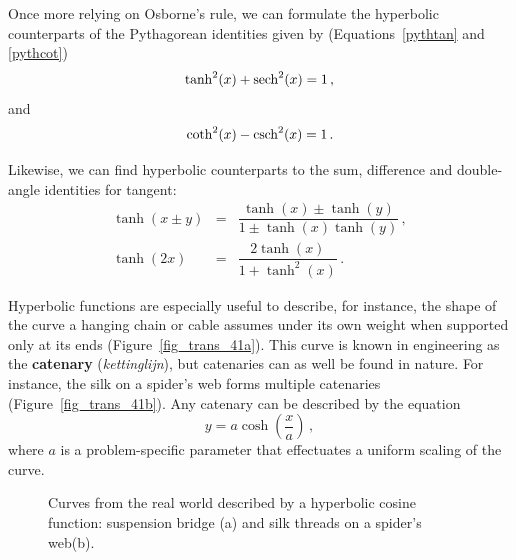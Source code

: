 Once more relying on Osborne's rule, we can formulate the hyperbolic counterparts of the Pythagorean identities given by (Equations~\eqref{pythtan} and \eqref{pythcot})
\begin{equation}
\tanh^{2}(x)+\operatorname{sech}^{2}(x) =1 \,,
\label{pythtanh}
\end{equation}  
and
\begin{equation}
\coth^{2}(x) - \operatorname{csch}^{2}(x) = 1\,.
\label{pythcoth}
\end{equation}

Likewise, we can find hyperbolic counterparts to the sum, difference and double-angle identities for tangent:
\begin{eqnarray}
\tanh(x\pm y)&=&\dfrac{\tanh(x)\pm \tanh(y)}{1\pm \tanh(x)\tanh(y)}\,,\\[0.2cm]
\tanh(2x)&=&\dfrac{2\tanh(x)}{1+\tanh^2(x)}\,.
\end{eqnarray}

Hyperbolic functions are especially useful to describe, for instance, the shape of the curve a hanging chain or cable assumes under its own weight when supported only at its ends (Figure~\ref{fig_trans_41a}). This curve is known in engineering as the \textbf{catenary} (\textit{kettinglijn}), but catenaries can as well be found in nature. For instance, the silk on a spider's web forms multiple catenaries (Figure~\ref{fig_trans_41b}). Any catenary can be described by the equation
$$
y=a\cosh\left(\dfrac{x}{a}\right)\,,
$$
where $a$ is a problem-specific parameter that effectuates a uniform scaling of the curve. 

\begin{figure}
			\centering
\centerline{
\hspace{0.1cm}
}
	\caption{Curves from the real world described by a hyperbolic cosine function: suspension bridge (a) and silk threads on a spider's web(b).}
\end{figure}




